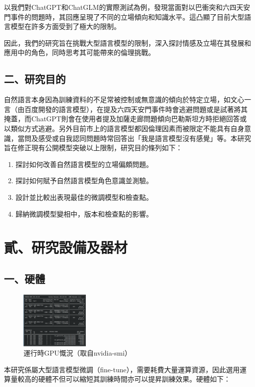 \documentclass[12pt,a4paper,MingLiU,UTF8,natbib]{article}
\begin{document}
以我們對ChatGPT和ChatGLM的實際測試為例，發現當面對以巴衝突和六四天安門事件的問題時，其回應呈現了不同的立場傾向和知識水平。這凸顯了目前大型語言模型在許多方面受到了極大的限制。

因此，我們的研究旨在挑戰大型語言模型的限制，深入探討情感及立場在其發展和應用中的角色，同時思考其可能帶來的倫理挑戰。
	\subsection{二、研究目的}
	自然語言本身因為訓練資料的不足常被控制或無意識的傾向於特定立場，如文心一言（由百度開發的語言模型），在提及六四天安門事件時會逃避問題或是試著將其掩蓋，而ChatGPT則會在使用者提及加薩走廊問題傾向巴勒斯坦方時拒絕回答或以類似方式逃避。另外目前市上的語言模型都因倫理因素而被限定不能具有自身意識，當問及感受或自我認同問題時常回答出「我是語言模型沒有感覺」等。本研究旨在修正現有公開模型突破以上限制，研究目的條列如下：
	\begin{enumerate}
		\item 探討如何改善自然語言模型的立場偏頗問題。
		\item 探討如何賦予自然語言模型角色意識並測驗。
		\item 設計並比較出表現最佳的微調模型和檢查點。
		\item 歸納微調模型變相中，版本和檢查點的影響。
	\end{enumerate}
	\section{貳、研究設備及器材}
	\subsection{一、硬體}
		\begin{figure}
		\centering
		\includegraphics[width=0.3\textwidth]{nividiasmi}
		\caption{運行時GPU慨況（取自nvidia-smi）}
	\end{figure}
	
	本研究係屬大型語言模型微調（fine-tune），需要耗費大量運算資源，因此選用運算量較高的硬體不但可以縮短其訓練時間亦可以提昇訓練效果。硬體如下：
	
\end{document}
